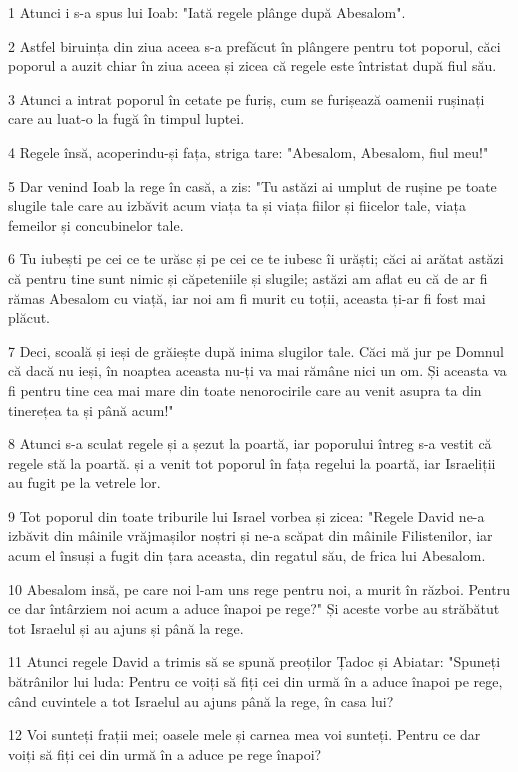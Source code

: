 \par 1 Atunci i s-a spus lui Ioab: "Iată regele plânge după Abesalom".
\par 2 Astfel biruința din ziua aceea s-a prefăcut în plângere pentru tot poporul, căci poporul a auzit chiar în ziua aceea și zicea că regele este întristat după fiul său.
\par 3 Atunci a intrat poporul în cetate pe furiș, cum se furișează oamenii rușinați care au luat-o la fugă în timpul luptei.
\par 4 Regele însă, acoperindu-și fața, striga tare: "Abesalom, Abesalom, fiul meu!"
\par 5 Dar venind Ioab la rege în casă, a zis: "Tu astăzi ai umplut de rușine pe toate slugile tale care au izbăvit acum viața ta și viața fiilor și fiicelor tale, viața femeilor și concubinelor tale.
\par 6 Tu iubești pe cei ce te urăsc și pe cei ce te iubesc îi urăști; căci ai arătat astăzi că pentru tine sunt nimic și căpeteniile și slugile; astăzi am aflat eu că de ar fi rămas Abesalom cu viață, iar noi am fi murit cu toții, aceasta ți-ar fi fost mai plăcut.
\par 7 Deci, scoală și ieși de grăiește după inima slugilor tale. Căci mă jur pe Domnul că dacă nu ieși, în noaptea aceasta nu-ți va mai rămâne nici un om. Și aceasta va fi pentru tine cea mai mare din toate nenorocirile care au venit asupra ta din tinerețea ta și până acum!"
\par 8 Atunci s-a sculat regele și a șezut la poartă, iar poporului întreg s-a vestit că regele stă la poartă. și a venit tot poporul în fața regelui la poartă, iar Israeliții au fugit pe la vetrele lor.
\par 9 Tot poporul din toate triburile lui Israel vorbea și zicea: "Regele David ne-a izbăvit din mâinile vrăjmașilor noștri și ne-a scăpat din mâinile Filistenilor, iar acum el însuși a fugit din țara aceasta, din regatul său, de frica lui Abesalom.
\par 10 Abesalom insă, pe care noi l-am uns rege pentru noi, a murit în război. Pentru ce dar întârziem noi acum a aduce înapoi pe rege?" Și aceste vorbe au străbătut tot Israelul și au ajuns și până la rege.
\par 11 Atunci regele David a trimis să se spună preoților Țadoc și Abiatar: "Spuneți bătrânilor lui luda: Pentru ce voiți să fiți cei din urmă în a aduce înapoi pe rege, când cuvintele a tot Israelul au ajuns până la rege, în casa lui?
\par 12 Voi sunteți frații mei; oasele mele și carnea mea voi sunteți. Pentru ce dar voiți să fiți cei din urmă în a aduce pe rege înapoi?
